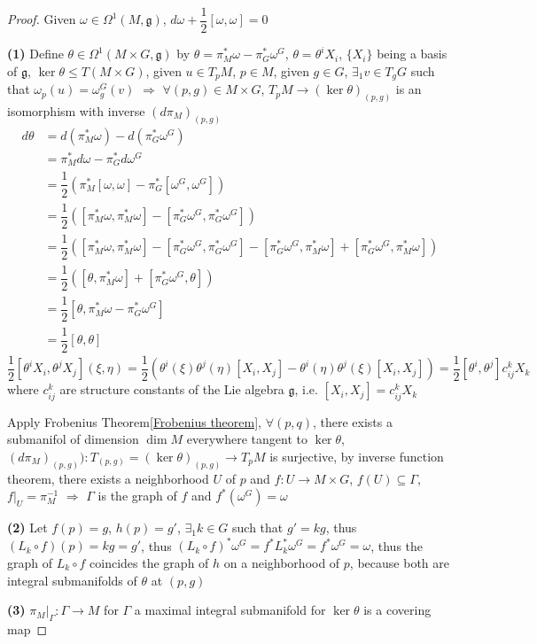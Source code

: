\documentclass[../main.tex]{subfiles}
\begin{document}
\begin{proof}
Given $\omega\in\Omega^1(M,\mathfrak g)$, $d\omega+\dfrac{1}{2}[\omega,\omega]=0$ \par
\textbf{(1) }Define $\theta\in\Omega^1(M\times G,\mathfrak g)$ by $\theta=\pi^*_M\omega-\pi^*_G\omega^G$, $\theta=\theta^iX_i$, $\{X_i\}$ being a basis of $\mathfrak g$, $\ker\theta\leq T(M\times G)$, given $u\in T_pM$, $p\in M$, given $g\in G$, $\exists_1v\in T_gG$ such that $\omega_p(u)=\omega^G_g(v)$ $\Rightarrow$ $\forall (p,g)\in M\times G$, $T_pM\to(\ker\theta)_{(p,g)}$ is an isomorphism with inverse $(d\pi_M)_{(p,g)}$
\begin{align*}
d\theta&=d(\pi^*_M\omega)-d(\pi^*_G\omega^G) \\
&=\pi^*_Md\omega-\pi^*_Gd\omega^G \\
&=\dfrac{1}{2}(\pi^*_M[\omega,\omega]-\pi^*_G[\omega^G,\omega^G]) \\
&=\dfrac{1}{2}([\pi^*_M\omega,\pi^*_M\omega]-[\pi^*_G\omega^G,\pi^*_G\omega^G]) \\
&=\dfrac{1}{2}([\pi^*_M\omega,\pi^*_M\omega]-[\pi^*_G\omega^G,\pi^*_G\omega^G]-[\pi^*_G\omega^G,\pi^*_M\omega]+[\pi^*_G\omega^G,\pi^*_M\omega]) \\
&=\dfrac{1}{2}([\theta,\pi^*_M\omega]+[\pi^*_G\omega^G,\theta]) \\
&=\dfrac{1}{2}[\theta,\pi^*_M\omega-\pi^*_G\omega^G] \\
&=\dfrac{1}{2}[\theta,\theta]
\end{align*}
$\dfrac{1}{2}[\theta^iX_i,\theta^jX_j](\xi,\eta)=\dfrac{1}{2}(\theta^i(\xi)\theta^j(\eta)[X_i,X_j]-\theta^i(\eta)\theta^j(\xi)[X_i,X_j])=\dfrac{1}{2}[\theta^i,\theta^j]c^k_{ij}X_k$ where $c^k_{ij}$ are structure constants of the Lie algebra $\mathfrak g$, i.e. $[X_i,X_j]=c^k_{ij} X_k$ \par
Apply Frobenius Theorem\ref{Frobenius theorem}, $\forall (p,q)$, there exists a submanifol of dimension $\dim M$ everywhere tangent to $\ker\theta$, $(d\pi_M)_{(p,g)}):T_{(p,g)}=(\ker\theta)_{(p,g)}\to T_pM$ is surjective, by inverse function theorem, there exists a neighborhood $U$ of $p$ and $f:U\to M\times G$, $f(U)\subseteq\Gamma$, $f|_{U}=\pi^{-1}_M$ $\Rightarrow$ $\Gamma$ is the graph of $f$ and $f^*(\omega^G)=\omega$ \par
\textbf{(2) }Let $f(p)=g$, $h(p)=g'$, $\exists_1k\in G$ such that $g'=kg$, thus $(L_k\circ f)(p)=kg=g'$, thus $(L_k\circ f)^*\omega^G=f^*L_k^*\omega^G=f^*\omega^G=\omega$, thus the graph of $L_k\circ f$ coincides the graph of $h$ on a neighborhood of $p$, because both are integral submanifolds of $\theta$ at $(p,g)$ \par
\textbf{(3) }$\pi_M|_{\Gamma}:\Gamma\to M$ for $\Gamma$ a maximal integral submanifold for $\ker\theta$ is a covering map
\end{proof}
\end{document}
